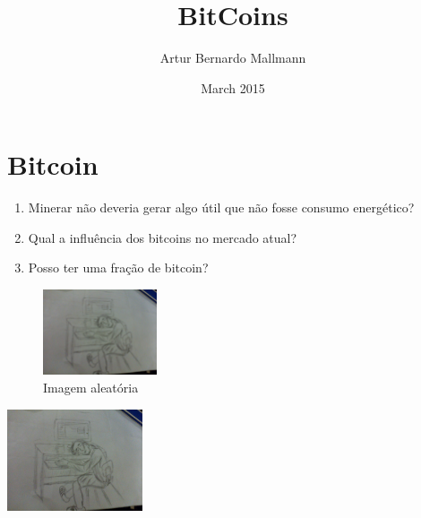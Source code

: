\documentclass{article}
\title{BitCoins}
\author{Artur Bernardo Mallmann }
\date{March 2015}
\begin{document}
\maketitle

\section{Bitcoin}

\begin{enumerate}
\item Minerar não deveria gerar algo útil que não fosse consumo energético?
\item Qual a influência dos bitcoins no mercado atual?
\item Posso ter uma fração de bitcoin?
\end{enumerate}

\begin{figure}[h]
\centering
\includegraphics[width=0.3\textwidth]{desenho.jpg}
\caption{Imagem aleatória}
\label{fig:my_label}
\end{figure}

\includegraphics[width=0.3\textwidth]{desenho.jpg}
\end{document}
